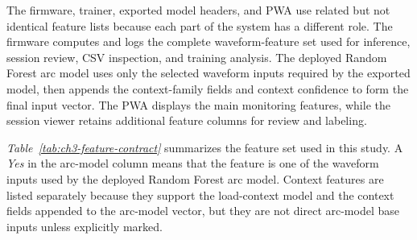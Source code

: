 The firmware, trainer, exported model headers, and PWA use related but not
identical feature lists because each part of the system has a different role.
The firmware computes and logs the complete waveform-feature set used for
inference, session review, CSV inspection, and training analysis. The deployed
Random Forest arc model uses only the selected waveform inputs required by the
exported model, then appends the context-family fields and context confidence
to form the final input vector. The PWA displays the main monitoring features,
while the session viewer retains additional feature columns for review and
labeling.

\textit{Table~\ref{tab:ch3-feature-contract}} summarizes the feature set used in
this study. A \textit{Yes} in the arc-model column means that the feature is one of
the waveform inputs used by the deployed Random Forest arc model. Context
features are listed separately because they support the load-context model and
the context fields appended to the arc-model vector, but they are not direct
arc-model base inputs unless explicitly marked.


